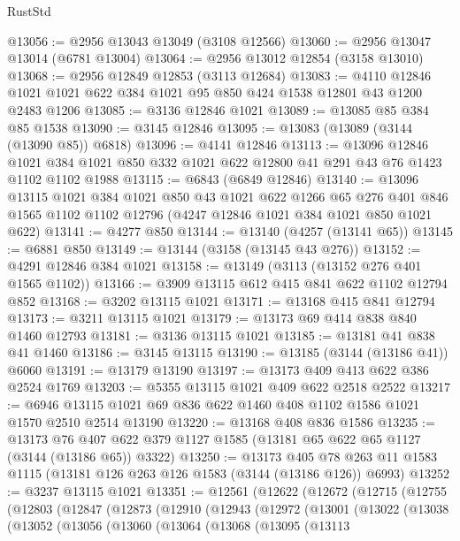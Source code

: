 \begin{lexlean}{RustStd}
\begin{coremodule}
{\begin{coremodule}
{{{{{{{{{{{{{{{{{{{{{{{{{{@13056 := @2956 @13043 @13049 (@3108 @12566)
@13060 := @2956 @13047 @13014 (@6781 @13004)
@13064 := @2956 @13012 @12854 (@3158 @13010)
@13068 := @2956 @12849 @12853 (@3113 @12684)
@13083 := @4110 @12846 @1021 @1021 @622 @384 @1021 @95 @850 @424 @1538 @12801 @43 @1200 @2483 @1206
@13085 := @3136 @12846 @1021
@13089 := @13085 @85 @384 @85 @1538
@13090 := @3145 @12846
@13095 := @13083 (@13089 (@3144 (@13090 @85)) @6818)
@13096 := @4141 @12846
@13113 := @13096
    @12846
    @1021
    @384
    @1021
    @850
    @332
    @1021
    @622
    @12800
    @41
    @291
    @43
    @76
    @1423
    @1102
    @1102
    @1988
@13115 := @6843 (@6849 @12846)
@13140 := @13096
    @13115
    @1021
    @384
    @1021
    @850
    @43
    @1021
    @622
    @1266
    @65
    @276
    @401
    @846
    @1565
    @1102
    @1102
    @12796
    (@4247 @12846 @1021 @384 @1021 @850 @1021 @622)
@13141 := @4277 @850
@13144 := @13140 (@4257 (@13141 @65))
@13145 := @6881 @850
@13149 := @13144 (@3158 (@13145 @43 @276))
@13152 := @4291 @12846 @384 @1021
@13158 := @13149 (@3113 (@13152 @276 @401 @1565 @1102))
@13166 := @3909 @13115 @612 @415 @841 @622 @1102 @12794 @852
@13168 := @3202 @13115 @1021
@13171 := @13168 @415 @841 @12794
@13173 := @3211 @13115 @1021
@13179 := @13173 @69 @414 @838 @840 @1460 @12793
@13181 := @3136 @13115 @1021
@13185 := @13181 @41 @838 @41 @1460
@13186 := @3145 @13115
@13190 := @13185 (@3144 (@13186 @41)) @6060
@13191 := @13179 @13190
@13197 := @13173 @409 @413 @622 @386 @2524 @1769
@13203 := @5355 @13115 @1021 @409 @622 @2518 @2522
@13217 := @6946 @13115 @1021 @69 @836 @622 @1460 @408 @1102 @1586 @1021 @1570 @2510 @2514 @13190
@13220 := @13168 @408 @836 @1586
@13235 := @13173
    @76
    @407
    @622
    @379
    @1127
    @1585
    (@13181 @65 @622 @65 @1127 (@3144 (@13186 @65)) @3322)
@13250 := @13173
    @405
    @78
    @263
    @11
    @1583
    @1115
    (@13181 @126 @263 @126 @1583 (@3144 (@13186 @126)) @6993)
@13252 := @3237 @13115 @1021
@13351 := @12561
    (@12622
      (@12672
        (@12715
          (@12755
            (@12803
              (@12847
                (@12873
                  (@12910
                    (@12943
                      (@12972
                        (@13001
                          (@13022
                            (@13038
                              (@13052
                                (@13056
                                  (@13060
                                    (@13064
                                      (@13068
                                        (@13095
                                          (@13113
}}}}}}}}}}}}}}}}}}}}}}}}}}
\end{coremodule}}
\end{coremodule}
\end{lexlean}
